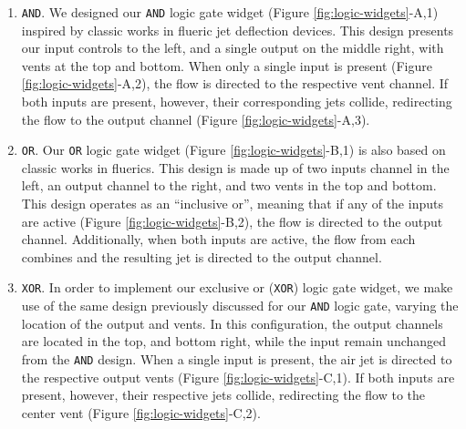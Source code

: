         \begin{enumerate}
          \item \texttt{AND}. 
            We designed our \texttt{AND} logic gate widget
            (Figure \ref{fig:logic-widgets}-A,1) inspired by classic works in
            flueric jet deflection devices. This design presents our input
            controls to the left, and a single output on the middle right,
            with vents at the top and bottom. When only a single input is
            present (Figure \ref{fig:logic-widgets}-A,2), the flow is directed to
            the respective vent channel. If both inputs are present,
            however, their corresponding jets collide, redirecting the flow
            to the output channel (Figure \ref{fig:logic-widgets}-A,3).

          \item \texttt{OR}. 
            Our \texttt{OR} logic gate widget
            (Figure \ref{fig:logic-widgets}-B,1) is also based on classic works
            in fluerics. This design is made up of two inputs channel in
            the left, an output channel to the right, and two vents in the
            top and bottom. This design operates as an ``inclusive or'',
            meaning that if any of the inputs are active
            (Figure \ref{fig:logic-widgets}-B,2), the flow is directed to the
            output channel. Additionally, when both inputs are active, the
            flow from each combines and the resulting jet is directed to
            the output channel.

          \item \texttt{XOR}. 
            In order to implement our exclusive or (\texttt{XOR}) logic
            gate widget, we make use of the same design previously
            discussed for our \texttt{AND} logic gate, varying the location
            of the output and vents. In this configuration, the output
            channels are located in the top, and bottom right, while the
            input remain unchanged from the \texttt{AND} design. When a
            single input is present, the air jet is directed to the
            respective output vents (Figure \ref{fig:logic-widgets}-C,1). If both
            inputs are present, however, their respective jets collide,
            redirecting the flow to the center vent
            (Figure \ref{fig:logic-widgets}-C,2).


\end{enumerate}
